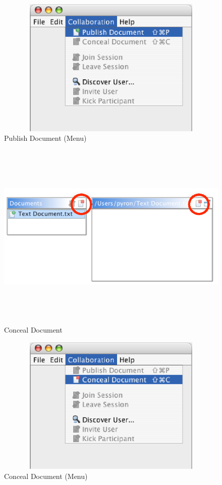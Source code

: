 \documentclass[11pt,a4paper]{article}
\begin{document}
\begin{figure}[H]
\begin{center}
  \includegraphics[height=2.62in, width=6.31in]{../images/usermanual/menu_collab_publish.eps}
\caption{Publish Document (Menu)}
\label{default}
\end{center}
\end{figure}

\begin{figure}[H]
\begin{center}
  \includegraphics[height=3.56in, width=4.56in]{../images/usermanual/g_editor_view_conceal.eps}
\caption{Conceal Document}
\label{default}
\end{center}
\end{figure}

\begin{figure}[H]
\begin{center}
  \includegraphics[height=2.62in, width=6.31in]{../images/usermanual/menu_collab_conceal.eps}
\caption{Conceal Document (Menu)}
\label{default}
\end{center}
\end{figure}
\end{document}
